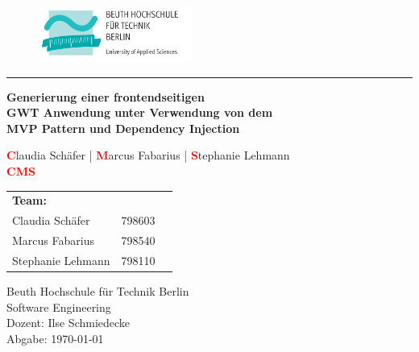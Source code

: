 \begin{titlepage}
\begin{figure}[htp] {
			\hspace{7cm} 
			\includegraphics[width=5cm]{./img/logo_beuth.png}\label{fig:beuth_logo}
		} \end{figure}
\vspace{-0.5cm}
\hrule

\vspace{3.0cm} {
  \begin{center}
    \large \textbf{Generierung einer frontendseitigen \\
    			  GWT Anwendung unter Verwendung von dem\\
    			  MVP Pattern und Dependency Injection}

    \vspace{0.8cm}
    \color{gray}
	    \textcolor{red}{\textbf{C}}laudia Schäfer	|
    	\textcolor{red}{\textbf{M}}arcus Fabarius	|
    	\textcolor{red}{\textbf{S}}tephanie Lehmann\\
    \textcolor{red}{\textbf{CMS}}\\
  \end{center}
}
\vspace*{\fill}

\hspace{-0.9cm} 
\begin{tabular}{l l l}
  \textbf{Team:} & \\
  Claudia Schäfer &  798603 \\
  Marcus Fabarius & 798540 \\
  Stephanie Lehmann & 798110 \\
\end{tabular}

\vspace{1.5cm}

\noindent 
Beuth Hochschule für Technik Berlin \\
Software Engineering \\
Dozent: Ilse Schmiedecke\\
\noindent 
Abgabe: \today

\thispagestyle{empty}
\end{titlepage}